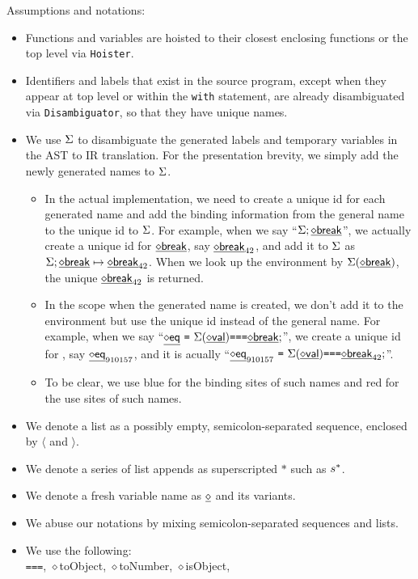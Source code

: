 Assumptions and notations:
\begin{itemize}
\item Functions and variables are hoisted to their closest enclosing functions
or the top level via {\tt Hoister}.
\item Identifiers and labels that exist in the source program,
except when they appear at top level or within the {\tt with} statement,
are already disambiguated via {\tt Disambiguator},
so that they have unique names.
\item We use $\Sigma$ to disambiguate the generated labels and temporary variables in the AST to IR translation.
For the presentation brevity, we simply add the newly generated names to $\Sigma$.
\begin{itemize}
\item In the actual implementation, we need to create a unique id for each generated name and
add the binding information from the general name to the unique id to $\Sigma$.
For example, when we say ``$\Sigma; \underline{\sf \diamond{break}}$'',
we actually create a unique id for $\underline{\sf \diamond{break}}$, say $\underline{\sf \diamond{break}}_{42}$, and add it to $\Sigma$ as $\Sigma; \underline{\sf \diamond{break}} \mapsto \underline{\sf \diamond{break}}_{42}$.
When we look up the environment by $\Sigma(\underline{\sf \diamond{break}})$, the unique $\underline{\sf \diamond{break}}_{42}$ is returned.
\item In the scope when the generated name is created, we don't add it to the environment but use the unique id instead of the general name.
For example, when we say ``$\newvar{eq}\ \verb+=+\ \env(\newvar{val}) \verb+===+ \newvar{break};$'',
we create a unique id for , say $\underline{\sf \diamond{eq}}_{910157}$, and it is acually
``$\newvar{eq}_{910157}\ \verb+=+\ \env(\newvar{val}) \verb+===+ \newvar{break}_{42};$''.
\item To be clear, we use blue for the binding sites of such names and red for the use sites of such names.
\end{itemize}
\item We denote a list as a possibly empty, semicolon-separated sequence, enclosed by $\langle$ and $\rangle$.
\item We denote a series of list appends as superscripted $*$ such as $s^*$.
\item We denote a fresh variable name as $\underline{\sf \diamond{}}$ and its variants.
\item We abuse our notations by mixing semicolon-separated sequences and lists.
\item We use the following:\\
\verb+===+, {\sf \ensuremath{\diamond}toObject}, {\sf \ensuremath{\diamond}toNumber}, {\sf \ensuremath{\diamond}isObject},

\end{itemize}
